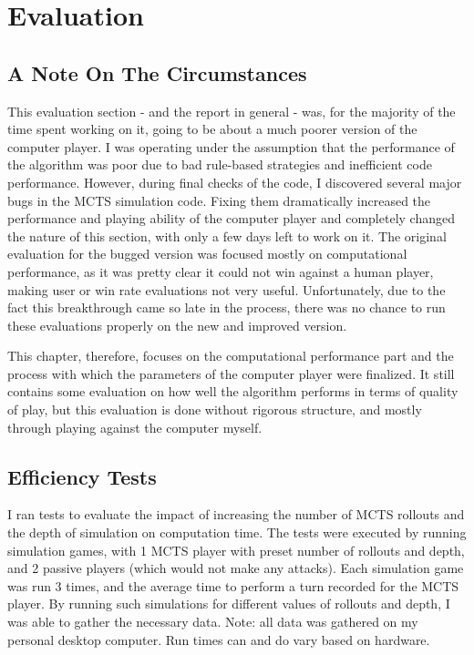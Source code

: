 \graphicspath{ {./Images/} }
\chapter{Evaluation}
\label{evaluation}
\section{A Note On The Circumstances}
\label{circumstanceNote}

This evaluation section - and the report in general - was, for the majority of the time spent working on it, going to be about a much poorer version of the computer player. I was operating under the assumption that the performance of the algorithm was poor due to bad rule-based strategies and inefficient code performance. However, during final checks of the code, I discovered several major bugs in the MCTS simulation code. Fixing them dramatically increased the performance and playing ability of the computer player and completely changed the nature of this section, with only a few days left to work on it. The original evaluation for the bugged version was focused mostly on computational performance, as it was pretty clear it could not win against a human player, making user or win rate evaluations not very useful. Unfortunately, due to the fact this breakthrough came so late in the process, there was no chance to run these evaluations properly on the new and improved version.

This chapter, therefore, focuses on the computational performance part and the process with which the parameters of the computer player were finalized. It still contains some evaluation on how well the algorithm performs in terms of quality of play, but this evaluation is done without rigorous structure, and mostly through playing against the computer myself.

\section{Efficiency Tests}
\label{efficiencyTests}

I ran tests to evaluate the impact of increasing the number of MCTS rollouts and the depth of simulation on computation time. The tests were executed by running simulation games, with 1 MCTS player with preset number of rollouts and depth, and 2 passive players (which would not make any attacks). Each simulation game was run 3 times, and the average time to perform a turn recorded for the MCTS player. By running such simulations for different values of rollouts and depth, I was able to gather the necessary data. Note: all data was gathered on my personal desktop computer. Run times can and do vary based on hardware.

